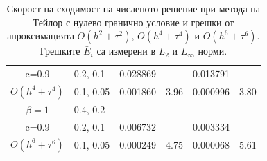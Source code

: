 \documentclass{beamer}
\begin{document}
\begin{frame}
\begin{table}[ht]
{\begin{tabular}{||c|l|ll|ll||}
       c=0.9                 &0.2, 0.1     & 0.028869   &        &  0.013791   &   \\
 $O(h^4+ \tau^4)$ 	&0.1, 0.05   	&0.001860 	& 3.96  & 0.000996  & 3.80  \\
\hline
  $\beta=1$     		&0.4, 0.2   	&            	&          	&                  &      \\
      c=0.9                  &0.2, 0.1   	&0.006732 	&            & 0.003334      &       \\
 $O(h^6+ \tau^6)$ 	&0.1, 0.05 	& 0.000249 	& 4.75 	& 0.000068  & 5.61        \\
\hline
\hline 
		\end{tabular}
		}%
		\caption{Скорост на сходимост на численото решение при метода на Тейлор с нулево гранично условие и грешки от апроксимацията $O(h^{2} + \tau^2 )$, $O(h^{4} + \tau^4 )$ и $O(h^{6} + \tau^6 )$. Грешките $\bar E_i$ са измерени в $L_2$ и $L_\infty$ норми.}
\label{table:A}
\end{table}

\end{frame}
\end{document}
